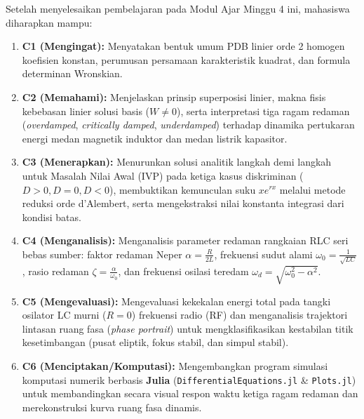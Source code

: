 \documentclass[11pt,a4paper]{article}
\theoremstyle{definition}
\begin{document}
\begin{tcolorbox}[colback=blue!5!white,colframe=headercolor,title=\textbf{Capaian Pembelajaran Khusus (Sub-CPMK 3)}]
Setelah menyelesaikan pembelajaran pada Modul Ajar Minggu 4 ini, mahasiswa diharapkan mampu:
\begin{enumerate}[leftmargin=*]
    \item \textbf{C1 (Mengingat):} Menyatakan bentuk umum PDB linier orde 2 homogen koefisien konstan, perumusan persamaan karakteristik kuadrat, dan formula determinan Wronskian.
    \item \textbf{C2 (Memahami):} Menjelaskan prinsip superposisi linier, makna fisis kebebasan linier solusi basis ($W \neq 0$), serta interpretasi tiga ragam redaman (\textit{overdamped}, \textit{critically damped}, \textit{underdamped}) terhadap dinamika pertukaran energi medan magnetik induktor dan medan listrik kapasitor.
    \item \textbf{C3 (Menerapkan):} Menurunkan solusi analitik langkah demi langkah untuk Masalah Nilai Awal (IVP) pada ketiga kasus diskriminan ($D > 0, D = 0, D < 0$), membuktikan kemunculan suku $x e^{rx}$ melalui metode reduksi orde d'Alembert, serta mengekstraksi nilai konstanta integrasi dari kondisi batas.
    \item \textbf{C4 (Menganalisis):} Menganalisis parameter redaman rangkaian RLC seri bebas sumber: faktor redaman Neper $\alpha = \frac{R}{2L}$, frekuensi sudut alami $\omega_0 = \frac{1}{\sqrt{LC}}$, rasio redaman $\zeta = \frac{\alpha}{\omega_0}$, dan frekuensi osilasi teredam $\omega_d = \sqrt{\omega_0^2 - \alpha^2}$.
    \item \textbf{C5 (Mengevaluasi):} Mengevaluasi kekekalan energi total pada tangki osilator LC murni ($R = 0$) frekuensi radio (RF) dan menganalisis trajektori lintasan ruang fasa (\textit{phase portrait}) untuk mengklasifikasikan kestabilan titik kesetimbangan (pusat eliptik, fokus stabil, dan simpul stabil).
    \item \textbf{C6 (Menciptakan/Komputasi):} Mengembangkan program simulasi komputasi numerik berbasis \textbf{Julia} (\texttt{DifferentialEquations.jl} \& \texttt{Plots.jl}) untuk membandingkan secara visual respon waktu ketiga ragam redaman dan merekonstruksi kurva ruang fasa dinamis.
\end{enumerate}
\end{tcolorbox}

\vspace{0.3cm}
\tableofcontents
\vspace{0.5cm}
\end{document}
